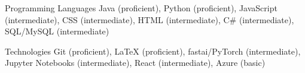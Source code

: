 


\begin{cvskills}


\cvskill
{Programming Languages} %
{Java (proficient), Python (proficient), JavaScript (intermediate), CSS (intermediate), HTML (intermediate), C\# (intermediate), SQL/MySQL (intermediate)} %


\cvskill
{Technologies} %
{Git (proficient),  \textrm{\LaTeX} (proficient),
fastai/PyTorch (intermediate), Jupyter Notebooks (intermediate), React (intermediate), Azure (basic)} %





\end{cvskills}